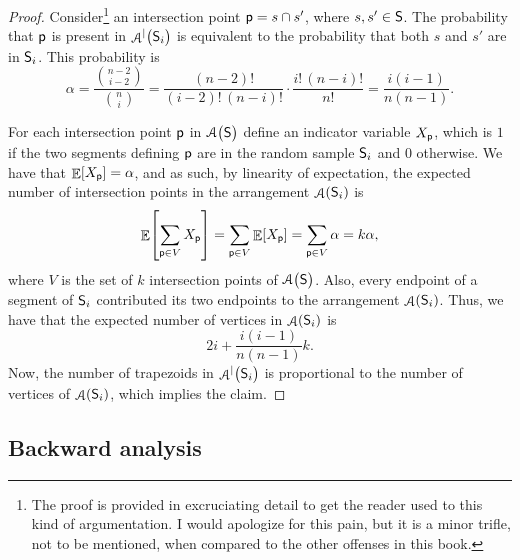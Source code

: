 \begin{proof}
    Consider\footnote{The proof is provided in excruciating detail to
       get the reader used to this kind of argumentation. I would
       apologize for this pain, but it is a minor trifle, not to be
       mentioned, when compared to the other offenses in this book.} %
    an intersection point $\mathsf{p} = s \cap s'$, where $s, s' \in
    \mathsf{S}$. The probability that $\mathsf{p}$ is present in
    $\ArrVD{\bigl.\SegSet_i}$ is equivalent to the probability that
    both $s$ and $s'$ are in $\mathsf{S}_i$. This probability is
    \begin{equation*}
        \alpha = \frac{\binom{n-2}{i-2}}{\binom{n}{i}}%
        = \frac{(n-2)!}{(i-2)! \, (n-i)!} \cdot \frac{i! \,
           (n-i)!}{n!}%
        = \frac{i(i-1)}{n(n-1)}.
    \end{equation*}
    
    For each intersection point $\mathsf{p}$ in $\ArrX{\bigl. \SegSet }$
    define an indicator variable $X_{\mathsf{p}}$, which is $1$ if the two
    segments defining $\mathsf{p}$ are in the random sample  $\mathsf{S}_i$ and $0$ otherwise. We have that
    $\mathop{\mathbb{E}}\!\left[ {X_{\mathsf{p}}} \right]=\alpha$, and as such, by linearity of expectation,
    the expected number of intersection points in the arrangement
    $\Arr\pth{\SegSet_i}$ is
    \begin{equation*}
        \mathop{\mathbb{E}}\!\left[ { \sum_{\mathsf{p} \in V} X_{\mathsf{p}}} \right] = \sum_{\mathsf{p} \in V} \mathop{\mathbb{E}}\!\left[ {
           X_{\mathsf{p}}} \right] = \sum_{\mathsf{p} \in V} \alpha = k \alpha,
    \end{equation*}
    where $V$ is the set of $k$ intersection points of $\ArrX{
       \bigl. \SegSet }$.  Also, every endpoint of a segment of
    $\mathsf{S}_i$ contributed its two endpoints to the arrangement
    $\Arr\pth{\SegSet_i}$. Thus, we have that the expected number of
    vertices in $\Arr\pth{\SegSet_i}$ is
    \begin{equation*}
        2i + \frac{i(i-1)}{n(n-1)}k.
    \end{equation*}
    Now, the number of trapezoids in $\ArrVD{\bigl.\SegSet_i}$ is
    proportional to the number of vertices of $\Arr\pth{\SegSet_i}$,
    which implies the claim.
\end{proof}



\subsection{Backward analysis}

